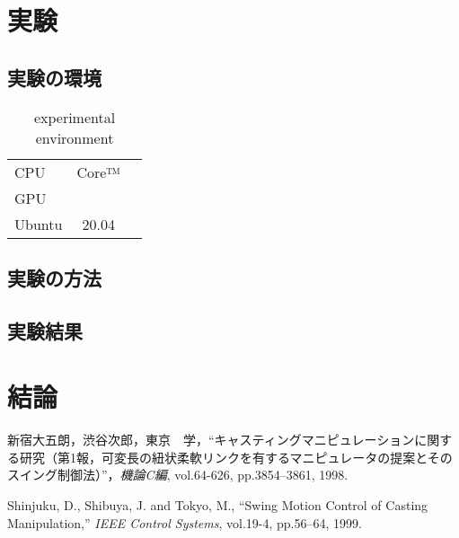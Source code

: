 \documentclass{jarticle}
\begin{document}

\section{実験}%

\subsection{実験の環境}

\begin{table}[hbtp]
  \caption{experimental environment}
  \label{table:data_type}
  \centering
  \begin{tabular}{lcr}
    \hline
    CPU & Core™  \\
    GPU &  \\
    Ubuntu & 20.04 \\
  
    \hline
  \end{tabular}
\end{table}

\subsection{実験の方法}

\subsection{実験結果}

\section{結論}%




\footnotesize
\begin{thebibliography}{99}

	新宿大五朗，渋谷次郎，東京　学，``キャスティングマニピュレーションに関する研究（第1報，可変長の紐状柔軟リンクを有するマニピュレータの提案とそのスイング制御法）''，{\it 機論C編}, vol.64-626, pp.3854--3861, 1998.

	Shinjuku, D., Shibuya, J. and Tokyo, M., ``Swing Motion Control of Casting Manipulation,'' {\it IEEE Control Systems}, vol.19-4, pp.56--64, 1999.

\end{thebibliography}

\normalsize
\end{document}
